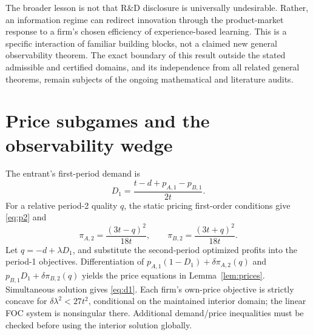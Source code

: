 \documentclass[11pt,a4paper]{article}
\numberwithin{equation}{section}
\theoremstyle{remark}
\begin{document}
The broader lesson is not that R\&D disclosure is universally undesirable. Rather, an information regime can redirect innovation through the product-market response to a firm's chosen efficiency of experience-based learning. This is a specific interaction of familiar building blocks, not a claimed new general observability theorem. The exact boundary of this result outside the stated admissible and certified domains, and its independence from all related general theorems, remain subjects of the ongoing mathematical and literature audits.

\appendix
\section{Price subgames and the observability wedge}\label{app:prices}

The entrant's first-period demand is
\begin{equation}
D_1=\frac{t-d+p_{A,1}-p_{B,1}}{2t}. \label{eq:demanda}
\end{equation}
For a relative period-2 quality $q$, the static pricing first-order conditions give \eqref{eq:p2} and
\[
\pi_{A,2}=\frac{(3t-q)^2}{18t},\qquad
\pi_{B,2}=\frac{(3t+q)^2}{18t}.
\]
Let $q=-d+\lambda D_1$, and substitute the second-period optimized profits into the period-1 objectives. Differentiation of $p_{A,1}(1-D_1)+\delta\pi_{A,2}(q)$ and $p_{B,1}D_1+\delta\pi_{B,2}(q)$ yields the price equations in Lemma~\ref{lem:prices}. Simultaneous solution gives \eqref{eq:d1}. Each firm's own-price objective is strictly concave for $\delta\lambda^2<27t^2$, conditional on the maintained interior domain; the linear FOC system is nonsingular there. Additional demand/price inequalities must be checked before using the interior solution globally.
\end{document}
